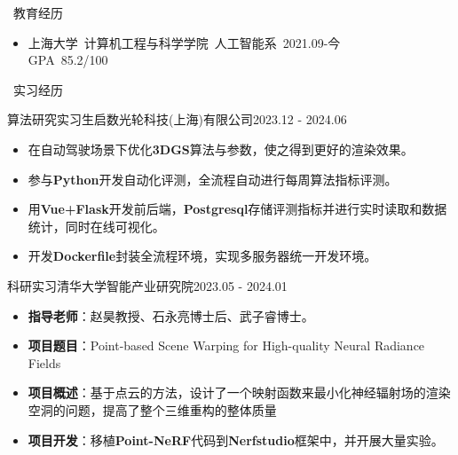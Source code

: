 \documentclass[UTF8]{resume}
\begin{document}
\begin{rSection}{\faGraduationCap~教育经历}
    \begin{itemize}
        \item 上海大学~计算机工程与科学学院~人工智能系~\hfill 2021.09-今 \\ GPA~85.2/100
    \end{itemize}
\end{rSection}
 
\begin{rSection}{\faBriefcase~实习经历}
    \begin{rExperience}{算法研究实习生}{启数光轮科技(上海)有限公司}{2023.12 - 2024.06}
        \begin{itemize}
            \itemsep -0.5em \vspace{-0.5em}
            \item 在自动驾驶场景下优化\textbf{3DGS}算法与参数，使之得到更好的渲染效果。
            \item 参与\textbf{Python}开发自动化评测，全流程自动进行每周算法指标评测。
            \item 用\textbf{Vue+Flask}开发前后端，\textbf{Postgresql}存储评测指标并进行实时读取和数据统计，同时在线可视化。
            \item 开发\textbf{Dockerfile}封装全流程环境，实现多服务器统一开发环境。
        \end{itemize}
    \end{rExperience}

    \begin{rExperience}{科研实习}{清华大学智能产业研究院}{2023.05 - 2024.01}
        \begin{itemize}
            \itemsep -0.5em \vspace{-0.5em}
            \item \textbf{指导老师}：赵昊教授、石永亮博士后、武子睿博士。
            \item \textbf{项目题目}：Point-based Scene Warping for High-quality Neural Radiance Fields
            \item \textbf{项目概述}：基于点云的方法，设计了一个映射函数来最小化神经辐射场的渲染空洞的问题，提高了整个三维重构的整体质量
            \item \textbf{项目开发}：移植\textbf{Point-NeRF}代码到\textbf{Nerfstudio}框架中，并开展大量实验。
        \end{itemize}
    \end{rExperience}
\end{rSection}
\end{document}

